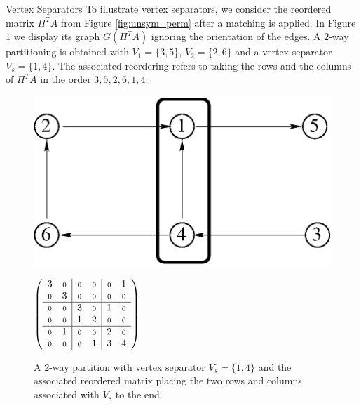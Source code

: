 \begin{example}{Vertex Separators}\label{exm:vsep}
To illustrate vertex separators, we consider the reordered matrix $\Pi^TA$
from Figure \ref{fig:unsym_perm} after a  matching is applied.
In Figure \ref{fig:matrixvertex} we display its graph $G(\Pi^T A)$ ignoring
the orientation of the edges. A 
$2$-way partitioning is obtained with $V_1 = \{3,5\}$, $V_2 = \{2,6\}$ and
a vertex separator $V_s = \{1,4\}$. The associated reordering
refers to taking the rows and the columns of $\Pi^T A$ in the order
$3,5,2,6,1,4$.
\end{example}
\begin{figure}%
{
\begin{minipage}{7.0cm}
{
\begin{minipage}{.6\textwidth}
\includegraphics[width=\textwidth]{figures/matrixvertex}
\end{minipage}
}
\hfil
{
\begin{minipage}{.3\textwidth}
    $\left(
        \begin{array}{cc|cc|cc}
        3   & \scriptstyle{0} & \scriptstyle{0} & \scriptstyle{0} & \scriptstyle{0}   &  1  \\
        \scriptstyle{0} & 3   &  \scriptstyle{0}& \scriptstyle{0} & \scriptstyle{0} & \scriptstyle{0}   \\ \hline
        \scriptstyle{0} &  \scriptstyle{0}& 3   & \scriptstyle{0} &  1 & \scriptstyle{0} \\
        \scriptstyle{0} & \scriptstyle{0} &  1 &  2  & \scriptstyle{0}   & \scriptstyle{0} \\ \hline
        \scriptstyle{0}  & 1  & \scriptstyle{0} & \scriptstyle{0} & 2   & \scriptstyle{0}   \\
        \scriptstyle{0}   & \scriptstyle{0} & \scriptstyle{0} & 1   & 3 & 4   
        \end{array}
    \right)$
\end{minipage}
}
\end{minipage}
}
\caption{A $2$-way partition with vertex separator $V_s=\{1,4\}$
and the associated reordered matrix placing the two rows and columns associated 
with $V_s$ to the end.}\label{fig:matrixvertex}
\end{figure}

